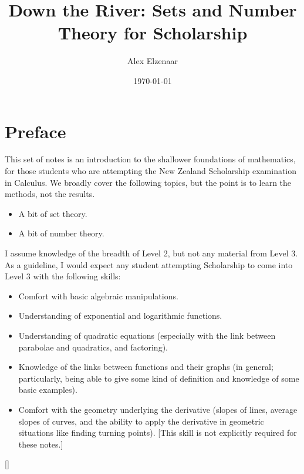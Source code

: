 \documentclass[a4paper,leqno]{article}
\title{Down the River: Sets and Number Theory for Scholarship}
\author{Alex Elzenaar}
\date{\today}
\numberwithin{equation}{section}
\theoremstyle{definition}
\theoremstyle{remark}
\begin{document}
\maketitle
\setcounter{tocdepth}{1}
\tableofcontents
\section*{Preface}
This set of notes is an introduction to the shallower foundations of mathematics, for those students who
are attempting the New Zealand Scholarship examination in Calculus. We broadly cover the following topics,
but the point is to learn the methods, not the results.
\begin{itemize}
  \item A bit of set theory.
  \item A bit of number theory.
\end{itemize}

I assume knowledge of the breadth of Level 2, but not any material from Level 3. As a guideline, I would
expect any student attempting Scholarship to come into Level 3 with the following skills:
\begin{itemize}
  \item Comfort with basic algebraic manipulations.
  \item Understanding of exponential and logarithmic functions.
  \item Understanding of quadratic equations (especially with the link between parabolae and quadratics, and factoring).
  \item Knowledge of the links between functions and their graphs (in general; particularly, being able to give some kind
        of definition and knowledge of some basic examples).
  \item Comfort with the geometry underlying the derivative (slopes of lines, average slopes of curves, and the ability
        to apply the derivative in geometric situations like finding turning points). [This skill is not explicitly required for these notes.]
\end{itemize}

[{\titlerule[0.8pt]}]
\let\oldsection\section
\renewcommand\section{\clearpage\oldsection}
\end{document}
